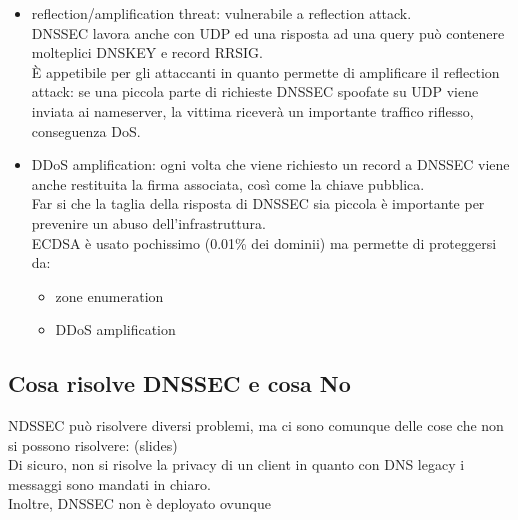 \documentclass[12pt, oneside]{extbook} %
\begin{document}
\begin{itemize}
	\item reflection/amplification threat: vulnerabile a reflection attack.
    \\DNSSEC lavora anche con UDP ed una risposta ad una query può contenere molteplici DNSKEY e record RRSIG.
    \\È appetibile per gli attaccanti in quanto permette di amplificare il reflection attack: se una piccola parte di richieste DNSSEC spoofate su UDP viene inviata ai nameserver, la vittima riceverà un importante traffico riflesso, conseguenza DoS.
	\item DDoS amplification: ogni volta che viene richiesto un record a DNSSEC viene anche restituita la firma associata, così come la chiave pubblica.
    \\Far si che la taglia della risposta di DNSSEC sia piccola è importante per prevenire un abuso dell'infrastruttura.
        \\ECDSA è usato pochissimo (0.01\% dei dominii) ma permette di proteggersi da:
        \begin{itemize}
            \item zone enumeration
            \item DDoS amplification
        \end{itemize}
\end{itemize}

\subsection{Cosa risolve DNSSEC e cosa No}
NDSSEC può risolvere diversi problemi, ma ci sono comunque delle cose che non si possono risolvere: (slides)\\Di sicuro, non si risolve la privacy di un client in quanto con DNS legacy i messaggi sono mandati in chiaro.\\Inoltre, DNSSEC non è deployato ovunque
\end{document}
